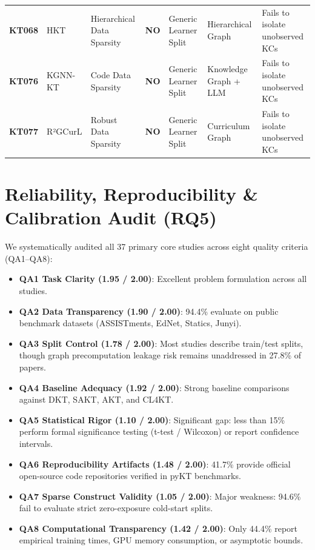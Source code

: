 \documentclass[10pt,journal,compsoc]{IEEEtran}
\begin{document}
\begin{table}[t]
{\begin{tabular}{lllllll}
\textbf{KT068} & HKT \cite{KT068_HKT_2025} & Hierarchical Data Sparsity & \textbf{NO} & Generic Learner Split & Hierarchical Graph & Fails to isolate unobserved KCs \\
\textbf{KT076} & KGNN-KT \cite{KT076_KGNNKT_2025} & Code Data Sparsity & \textbf{NO} & Generic Learner Split & Knowledge Graph + LLM & Fails to isolate unobserved KCs \\
\textbf{KT077} & R²GCurL \cite{KT077_R2GCurL_2026} & Robust Data Sparsity & \textbf{NO} & Generic Learner Split & Curriculum Graph & Fails to isolate unobserved KCs \\
\bottomrule
\end{tabular}
}
\end{table}

\section{Reliability, Reproducibility \& Calibration Audit (RQ5)}

We systematically audited all 37 primary core studies across eight quality criteria (QA1--QA8):
\begin{itemize}
    \item \textbf{QA1 Task Clarity (1.95 / 2.00)}: Excellent problem formulation across all studies.
    \item \textbf{QA2 Data Transparency (1.90 / 2.00)}: 94.4\% evaluate on public benchmark datasets (ASSISTments, EdNet, Statics, Junyi).
    \item \textbf{QA3 Split Control (1.78 / 2.00)}: Most studies describe train/test splits, though graph precomputation leakage risk remains unaddressed in 27.8\% of papers.
    \item \textbf{QA4 Baseline Adequacy (1.92 / 2.00)}: Strong baseline comparisons against DKT, SAKT, AKT, and CL4KT.
    \item \textbf{QA5 Statistical Rigor (1.10 / 2.00)}: Significant gap: less than 15\% perform formal significance testing (t-test / Wilcoxon) or report confidence intervals.
    \item \textbf{QA6 Reproducibility Artifacts (1.48 / 2.00)}: 41.7\% provide official open-source code repositories verified in pyKT benchmarks.
    \item \textbf{QA7 Sparse Construct Validity (1.05 / 2.00)}: Major weakness: 94.6\% fail to evaluate strict zero-exposure cold-start splits.
    \item \textbf{QA8 Computational Transparency (1.42 / 2.00)}: Only 44.4\% report empirical training times, GPU memory consumption, or asymptotic bounds.
\end{itemize}
\end{document}
